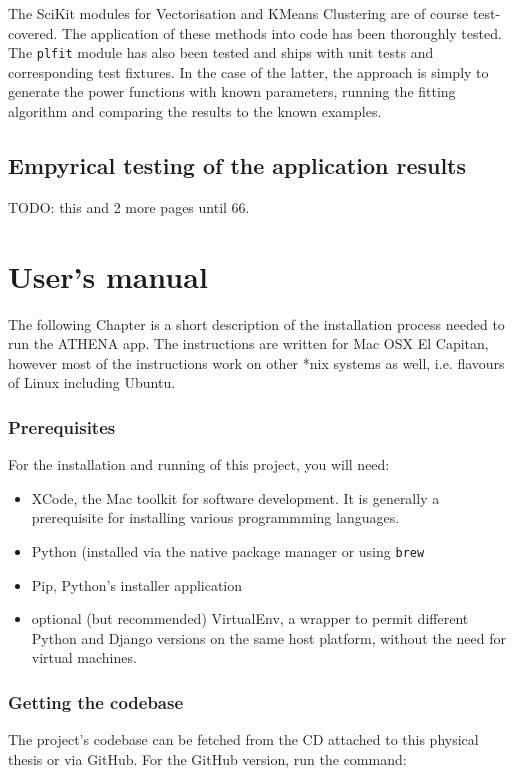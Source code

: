 \documentclass[12pt,a4paper,twoside]{report}
\begin{document}
The SciKit modules for Vectorisation and KMeans Clustering are of course test-covered. The application of these methods into code has been thoroughly tested. The \texttt{plfit} module has also been tested and ships with unit tests and corresponding test fixtures. In the case of the latter, the approach is simply to generate the power functions with known parameters, running the fitting algorithm and comparing the results to the known examples.

\section{Empyrical testing of the application results}
{\color{red} TODO: this and 2 more pages until 66.}

\chapter{User's manual}
The following Chapter is a short description of the installation process needed to run the ATHENA app. The instructions are written for Mac OSX El Capitan, however most of the instructions work on other *nix systems as well, i.e. flavours of Linux including Ubuntu.

\subsection*{Prerequisites}
For the installation and running of this project, you will need:

\begin{itemize}
\item XCode, the Mac toolkit for software development. It is generally a prerequisite for installing various programmming languages.
\item Python (installed via the native package manager or using \texttt{brew}
\item Pip, Python's installer application
\item optional (but recommended) VirtualEnv, a wrapper to permit different Python and Django versions on the same host platform, without the need for virtual machines.
\end{itemize}

\subsection*{Getting the codebase}
The project's codebase can be fetched from the CD attached to this physical thesis or via GitHub. For the GitHub version, run the command:
\end{document}
